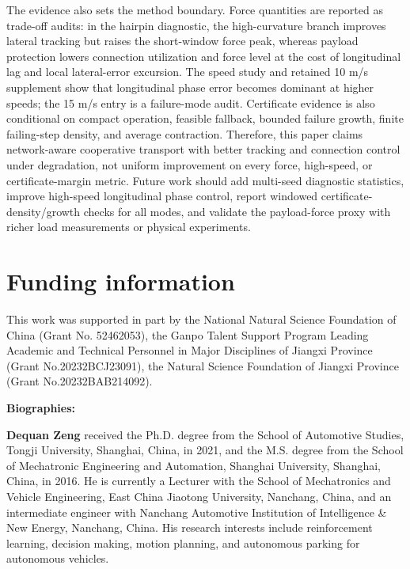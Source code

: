 \documentclass[twocolumn,3p,times,procedia]{elsarticle}
\begin{document}
The evidence also sets the method boundary. Force quantities are reported as trade-off audits: in the hairpin diagnostic, the high-curvature branch improves lateral tracking but raises the short-window force peak, whereas payload protection lowers connection utilization and force level at the cost of longitudinal lag and local lateral-error excursion. The speed study and retained 10 m/s supplement show that longitudinal phase error becomes dominant at higher speeds; the 15 m/s entry is a failure-mode audit. Certificate evidence is also conditional on compact operation, feasible fallback, bounded failure growth, finite failing-step density, and average contraction. Therefore, this paper claims network-aware cooperative transport with better tracking and connection control under degradation, not uniform improvement on every force, high-speed, or certificate-margin metric. Future work should add multi-seed diagnostic statistics, improve high-speed longitudinal phase control, report windowed certificate-density/growth checks for all modes, and validate the payload-force proxy with richer load measurements or physical experiments.

\section*{Funding information}
This work was supported in part by the National Natural Science Foundation of China (Grant No. 52462053), the Ganpo Talent Support Program Leading Academic and Technical Personnel in Major Disciplines of Jiangxi Province (Grant No.20232BCJ23091), the Natural Science Foundation of Jiangxi Province (Grant No.20232BAB214092).

\FloatBarrier
\begingroup
\fontsize{7}{7}\selectfont
\setlength{\bibsep}{0pt plus 0.1ex}


\endgroup

\noindent\textbf{Biographies:}
\par\smallskip

\noindent\textbf{Dequan Zeng} received the Ph.D. degree from the School of Automotive Studies, Tongji University, Shanghai, China, in 2021, and the M.S. degree from the School of Mechatronic Engineering and Automation, Shanghai University, Shanghai, China, in 2016. He is currently a Lecturer with the School of Mechatronics and Vehicle Engineering, East China Jiaotong University, Nanchang, China, and an intermediate engineer with Nanchang Automotive Institution of Intelligence \& New Energy, Nanchang, China. His research interests include reinforcement learning, decision making, motion planning, and autonomous parking for autonomous vehicles.
\end{document}
